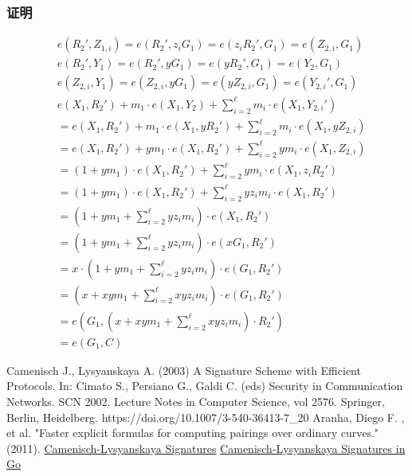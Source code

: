 \documentclass[a4paper,10pt]{article}
\begin{document}
\subsubsection{证明}
\begin{align*}
  & e(R_2',Z_{1,i}) = e(R_2',z_iG_1) = e(z_iR_2',G_1) = e(Z_{2,i},G_1) \\
  & e(R_2',Y_1) = e(R_2',yG_1) = e(yR_2',G_1) = e(Y_2,G_1) \\
  & e(Z_{2,i},Y_1) = e(Z_{2,i},yG_1) = e(yZ_{2,i},G_1) = e(Y_{2,i}',G_1)   \\
  & e(X_1,R_2')+m_1\cdot e(X_1,Y_2)+\sum_{i=2}^{\ell} m_i\cdot e(X_1,Y_{2,i}') \\
  &= e(X_1,R_2')+m_1\cdot e(X_1,yR_2')+\sum_{i=2}^{\ell} m_i\cdot e(X_1,yZ_{2,i}) \\
  &= e(X_1,R_2')+ym_1\cdot e(X_1,R_2')+\sum_{i=2}^{\ell} ym_i\cdot e(X_1,Z_{2,i}) \\
  &= (1+ym_1)\cdot e(X_1,R_2')+\sum_{i=2}^{\ell} y m_i\cdot e(X_1,z_iR_2') \\
  &= (1+ym_1)\cdot e(X_1,R_2')+\sum_{i=2}^{\ell} y z_i m_i\cdot e(X_1,R_2') \\
  &= (1+ym_1+\sum_{i=2}^{\ell} y z_i m_i)\cdot e(X_1,R_2') \\
  &= (1+ym_1+\sum_{i=2}^{\ell} y z_i m_i)\cdot e(xG_1,R_2') \\
  &= x\cdot(1+ym_1+\sum_{i=2}^{\ell} y z_i m_i)\cdot e(G_1,R_2') \\
  &= (x+x y m_1+\sum_{i=2}^{\ell} x y z_i m_i)\cdot e(G_1,R_2') \\
  &= e(G_1,(x+x y m_1+\sum_{i=2}^{\ell} x y z_i m_i)\cdot R_2') \\
  &= e(G_1,C)
\end{align*}

\begin{thebibliography}{99}

   Camenisch J., Lysyanskaya A. (2003) A Signature Scheme with Efficient Protocols. In: Cimato S., Persiano G., Galdi C. (eds) Security in Communication Networks. SCN 2002. Lecture Notes in Computer Science, vol 2576. Springer, Berlin, Heidelberg. https://doi.org/10.1007/3-540-36413-7\_20
   Aranha, Diego F. , et al. "Faster explicit formulas for computing pairings over ordinary curves." (2011).
   \href{https://asecuritysite.com/encryption/cl}{Camenisch-Lysyanskaya Signatures}
   \href{https://asecuritysite.com/encryption/go_cl}{Camenisch-Lysyanskaya Signatures in Go}
\end{thebibliography}
\end{document}
